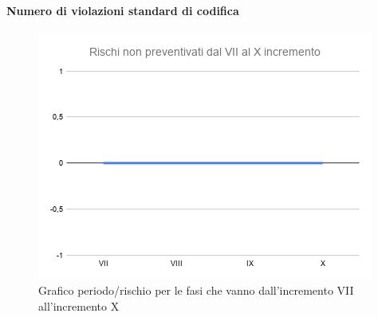 \paragraph{Numero di violazioni standard di codifica}
\begin{figure}[H]
			\centering%
			\includegraphics[width=0.8\linewidth]{./res/images/RischiNonPreven_4.png}
			\caption{Grafico periodo/rischio per le fasi che vanno dall'incremento VII all'incremento X}
			\label{fig:Grafico periodo/rischio per le fasi che vanno dall'incremento VII all'incremento X}
	\end{figure}

